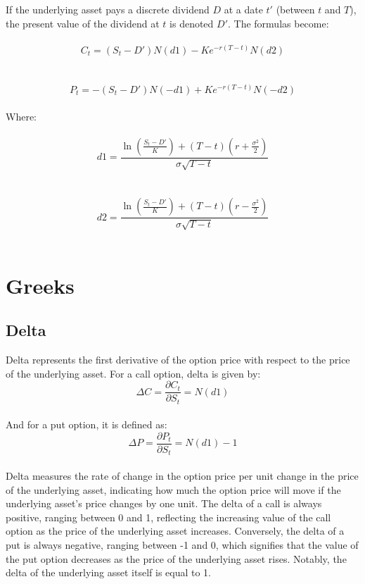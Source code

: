 \documentclass[a4paper,10pt]{article}
\begin{document}
    \noindent If the underlying asset pays a discrete dividend \( D \) at a date \( t' \) (between \( t \) and \( T \)), the present value of the dividend at \( t \) is denoted \( D' \). The formulas become:\\
    \\\[ C_t = (S_t - D') N(d1) - K e^{-r(T-t)} N(d2) \]\\
    \\\[ P_t = -(S_t - D') N(-d1) + K e^{-r(T-t)} N(-d2) \]\\
    
    \noindent Where:\\
    \\\[ d1 = \frac{\ln \left( \frac{S_t - D'}{K} \right) + (T-t) \left( r + \frac{\sigma^2}{2} \right)}{\sigma \sqrt{T-t}} \]\\
    \\\[ d2 = \frac{\ln \left( \frac{S_t - D'}{K} \right) + (T-t) \left( r - \frac{\sigma^2}{2} \right)}{\sigma \sqrt{T-t}} \]\\
    
\section*{Greeks}

    \subsection*{Delta}
        \noindent Delta represents the first derivative of the option price with respect to the price of the underlying asset. For a call option, delta is given by:\\\[ \Delta C = \frac{\partial C_t}{\partial S_t} = N(d1) \]\\ And for a put option, it is defined as: \\\[ \Delta P = \frac{\partial P_t}{\partial S_t} = N(d1) - 1 \]\\ Delta measures the rate of change in the option price per unit change in the price of the underlying asset, indicating how much the option price will move if the underlying asset's price changes by one unit. The delta of a call is always positive, ranging between 0 and 1, reflecting the increasing value of the call option as the price of the underlying asset increases. Conversely, the delta of a put is always negative, ranging between -1 and 0, which signifies that the value of the put option decreases as the price of the underlying asset rises. Notably, the delta of the underlying asset itself is equal to 1. \\
    
\end{document}

